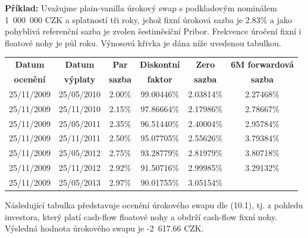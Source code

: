 \documentclass[a4paper]{book}
\begin{document}
\noindent \textbf{Příklad:} Uvažujme plain-vanilla úrokový swap s podkladovým nominálem 1~000~000 CZK a splatností tři roky, jehož fixní úroková sazba je 2.83\% a jako pohyblivá referenční sazba je zvolen šestiměsíční Pribor. Frekvence úročení fixní i floatové nohy je půl roku. Výnosová křivka je dána níže uvedenou tabulkou.
\begin{center}
     \begin{tabular}{|c c | c c c c|}
     \cline{1-6}
     \textbf{Datum} & \textbf{Datum} & \textbf{Par} & \textbf{Diskontní} & \textbf{Zero} & \textbf{6M forwardová} \\
     \textbf{ocenění} & \textbf{výplaty} & \textbf{sazba} & \textbf{faktor} & \textbf{sazba} & \textbf{sazba} \\
     \hline
     25/11/2009 & 25/05/2010 & 2.00\% & 99.00446\% & 2.03814\% & 2.27468\% \\
     25/11/2009 & 25/11/2010 & 2.15\% & 97.86664\% & 2.17986\% & 2.78667\% \\
     25/11/2009 & 25/05/2011 & 2.35\% & 96.51440\% & 2.40004\% & 2.95784\% \\
     25/11/2009 & 25/11/2011 & 2.50\% & 95.07705\% & 2.55626\% & 3.79384\% \\
     25/11/2009 & 25/05/2012 & 2.75\% & 93.28779\% & 2.81979\% & 3.80718\% \\
     25/11/2009 & 25/11/2012 & 2.92\% & 91.50716\% & 2.99985\% & 3.29132\% \\
     25/11/2009 & 25/05/2013 & 2.97\% & 90.01755\% & 3.05154\% & \\
     \cline{1-6}
     \end{tabular}
\end{center}
Následující tabulka představuje ocenění úrokového swapu dle (10.1), tj. z pohledu investora, který platí cash-flow floatové nohy a obdrží cash-flow fixní nohy. Výsledná hodnota úrokového swapu je -2~617.66 CZK.
\end{document}
